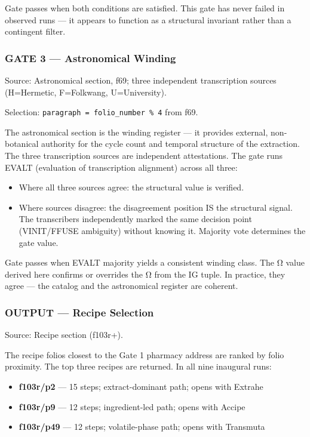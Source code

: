 Gate passes when both conditions are satisfied. This gate has never
failed in observed runs --- it appears to function as a structural
invariant rather than a contingent filter.

\hypertarget{gate-3-astronomical-winding}{%
\subsubsection{GATE 3 --- Astronomical
Winding}\label{gate-3-astronomical-winding}}

Source: Astronomical section, f69; three independent transcription
sources (H=Hermetic, F=Folkwang, U=University).

Selection: \texttt{paragraph\ =\ folio\_number\ \%\ 4} from f69.

The astronomical section is the winding register --- it provides
external, non-botanical authority for the cycle count and temporal
structure of the extraction. The three transcription sources are
independent attestations. The gate runs EVALT (evaluation of
transcription alignment) across all three:

\begin{itemize}
\tightlist
\item
  Where all three sources agree: the structural value is verified.
\item
  Where sources disagree: the disagreement position IS the structural
  signal. The transcribers independently marked the same decision point
  (VINIT/FFUSE ambiguity) without knowing it. Majority vote determines
  the gate value.
\end{itemize}

Gate passes when EVALT majority yields a consistent winding class. The Ω
value derived here confirms or overrides the Ω from the IG tuple. In
practice, they agree --- the catalog and the astronomical register are
coherent.

\hypertarget{output-recipe-selection}{%
\subsubsection{OUTPUT --- Recipe
Selection}\label{output-recipe-selection}}

Source: Recipe section (f103r+).

The recipe folios closest to the Gate 1 pharmacy address are ranked by
folio proximity. The top three recipes are returned. In all nine
inaugural runs:

\begin{itemize}
\tightlist
\item
  \textbf{f103r/p2} --- 15 steps; extract-dominant path; opens with
  Extrahe
\item
  \textbf{f103r/p9} --- 12 steps; ingredient-led path; opens with Accipe
\item
  \textbf{f103r/p49} --- 12 steps; volatile-phase path; opens with
  Transmuta
\end{itemize}

